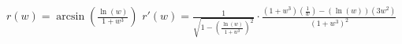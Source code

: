 $r(w)=\arcsin(\frac{\ln(w)}{1+w^3})$
$r\prime(w)=\frac{1}{\sqrt{1-(\frac{\ln(w)}{1+w^3})^2}} \cdot \frac{(1+w^3)(\frac{1}{w})-(\ln(w))(3w^2)}{(1+w^3)^2}$
